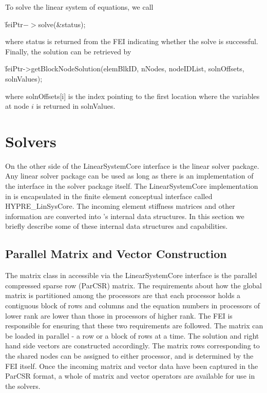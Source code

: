 To solve the linear system of equations, we call
\begin{tabbing}
\hspace{0.5in} \= {\sf feiPtr$->$solve(\&status);}
\end{tabbing}
where {\sf status} is returned from the {\sf FEI} indicating whether
the solve is successful. Finally, the solution can be retrieved by
\begin{tabbing}
\hspace{0.5in} \= {\sf feiPtr->getBlockNodeSolution(elemBlkID, nNodes, nodeIDList, solnOffsets, solnValues);}
\end{tabbing}
where {\sf solnOffsets[i]} is the index pointing to the first location 
where the variables at node $i$ is returned in {\sf solnValues}.

\section{\hypre{} Solvers} 

On the other side of the {\sf LinearSystemCore} interface is the linear
solver package. Any linear solver package can be used as long as there
is an implementation of the interface in the solver package itself. The
{\sf LinearSystemCore} implementation in \hypre{} is encapsulated in the 
\hypre{} finite element conceptual interface called {\sf HYPRE\_LinSysCore}.
The incoming element stiffness matrices and other information are 
converted into \hypre{}'s internal data structures. In this section we
briefly describe some of these internal data structures and capabilities.

\subsection{Parallel Matrix and Vector Construction} 

The matrix class in \hypre{} accessible via the {\sf LinearSystemCore} interface
is the parallel compressed sparse row ({\sf ParCSR}) matrix.  The 
requirements about how the global matrix is partitioned among the
processors are that each processor holds a contiguous block of rows and columns
and the equation numbers in processors of lower rank are lower than those
in processors of higher rank.  The {\sf FEI} is responsible for ensuring
that these two requirements are followed. The matrix can be loaded in
parallel - a row or a block of rows at a time.  The solution and right
hand side vectors are constructed accordingly. The matrix rows corresponding
to the shared nodes can be assigned to either processor, and is determined
by the {\sf FEI} itself. Once the incoming matrix and vector data have
been captured in the \hypre{} {\sf ParCSR} format, a whole of matrix and
vector operators are available for use in the \hypre{} solvers.

